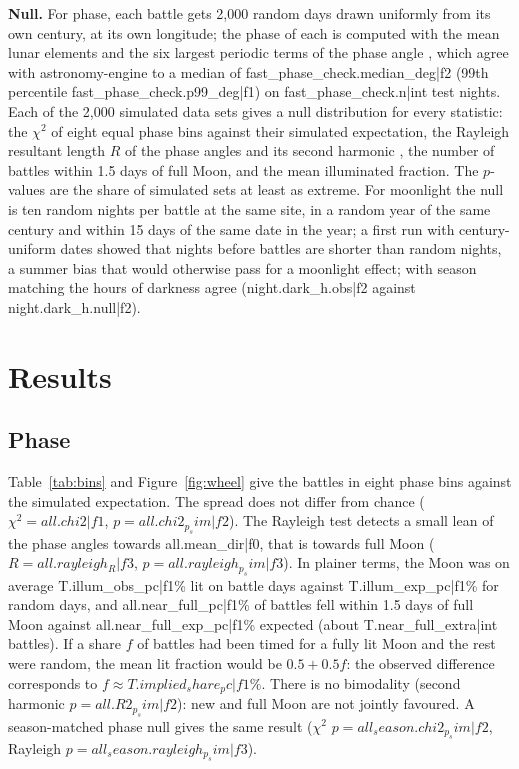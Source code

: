 \documentclass[11pt,a4paper]{article}
\begin{document}
\textbf{Null.} For phase, each battle gets 2,000 random days drawn uniformly from its own century, at its own longitude; the phase of each is computed with the mean lunar elements and the six largest periodic terms of the phase angle \citep{meeus}, which agree with astronomy-engine to a median of {{fast_phase_check.median_deg|f2}}\textdegree{} (99th percentile {{fast_phase_check.p99_deg|f1}}\textdegree) on {{fast_phase_check.n|int}} test nights. Each of the 2,000 simulated data sets gives a null distribution for every statistic: the $\chi^2$ of eight equal phase bins against their simulated expectation, the Rayleigh resultant length $R$ of the phase angles and its second harmonic \citep{fisher1993}, the number of battles within 1.5 days of full Moon, and the mean illuminated fraction. The $p$-values are the share of simulated sets at least as extreme. For moonlight the null is ten random nights per battle at the same site, in a random year of the same century and within 15 days of the same date in the year; a first run with century-uniform dates showed that nights before battles are shorter than random nights, a summer bias that would otherwise pass for a moonlight effect; with season matching the hours of darkness agree ({{night.dark_h.obs|f2}} against {{night.dark_h.null|f2}}).

\section{Results}
\subsection{Phase}
Table~\ref{tab:bins} and Figure~\ref{fig:wheel} give the battles in eight phase bins against the simulated expectation. The spread does not differ from chance ($\chi^2={{all.chi2|f1}}$, $p={{all.chi2_p_sim|f2}}$). The Rayleigh test detects a small lean of the phase angles towards {{all.mean_dir|f0}}\textdegree, that is towards full Moon ($R={{all.rayleigh_R|f3}}$, $p={{all.rayleigh_p_sim|f3}}$). In plainer terms, the Moon was on average {{T.illum_obs_pc|f1}}\% lit on battle days against {{T.illum_exp_pc|f1}}\% for random days, and {{all.near_full_pc|f1}}\% of battles fell within 1.5 days of full Moon against {{all.near_full_exp_pc|f1}}\% expected (about {{T.near_full_extra|int}} battles). If a share $f$ of battles had been timed for a fully lit Moon and the rest were random, the mean lit fraction would be $0.5 + 0.5f$: the observed difference corresponds to $f \approx {{T.implied_share_pc|f1}}\%$. There is no bimodality (second harmonic $p={{all.R2_p_sim|f2}}$): new and full Moon are not jointly favoured. A season-matched phase null gives the same result ($\chi^2$ $p={{all_season.chi2_p_sim|f2}}$, Rayleigh $p={{all_season.rayleigh_p_sim|f3}}$).
\end{document}
